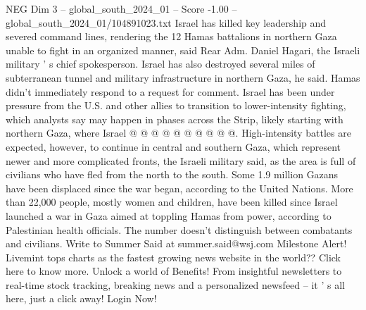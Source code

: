 \begin{textsample}{NEG Dim 3 – global\_south\_2024\_01 – Score -1.00 – global\_south\_2024\_01/104891023.txt}
Israel has killed key leadership and severed command lines, rendering the 12 Hamas battalions in northern Gaza unable to fight in an organized manner, said Rear Adm.
Daniel Hagari, the Israeli military ' s chief spokesperson.
Israel has also destroyed several miles of subterranean tunnel and military infrastructure in northern Gaza, he said.
Hamas didn't immediately respond to a request for comment.
Israel has been under pressure from the U.S. and other allies to transition to lower-intensity fighting, which analysts say may happen in phases across the Strip, likely starting with northern Gaza, where Israel @ @ @ @ @ @ @ @ @ @.
High-intensity battles are expected, however, to continue in central and southern Gaza, which represent newer and more complicated fronts, the Israeli military said, as the area is full of civilians who have fled from the north to the south.
Some 1.9 million Gazans have been displaced since the war began, according to the United Nations.
More than 22,000 people, mostly women and children, have been killed since Israel launched a war in Gaza aimed at toppling Hamas from power, according to Palestinian health officials.
The number doesn't distinguish between combatants and civilians.
Write to Summer Said at summer.said@wsj.com Milestone Alert!
Livemint tops charts as the fastest growing news website in the world??
Click here to know more.
Unlock a world of Benefits!
From insightful newsletters to real-time stock tracking, breaking news and a personalized newsfeed -- it ' s all here, just a click away!
Login Now!

\end{textsample}
